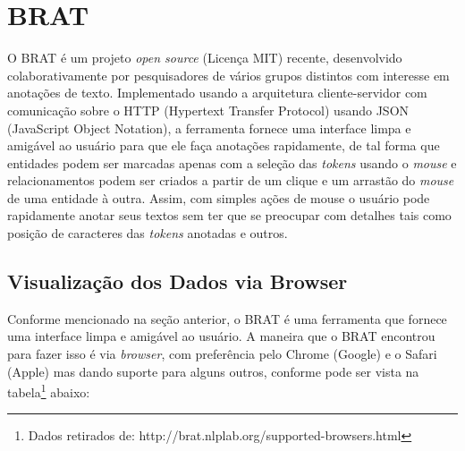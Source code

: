 \documentclass[11pt]{report}
\begin{document}
\section{BRAT}

\indent\indent O BRAT é um projeto \textit{open source} (Licença MIT) recente, desenvolvido colaborativamente por pesquisadores de vários grupos distintos com interesse em
anotações de texto. Implementado usando a arquitetura cliente-servidor com comunicação sobre o HTTP (Hypertext Transfer Protocol) usando JSON (JavaScript Object Notation), a
ferramenta fornece uma interface limpa e amigável ao usuário para que ele faça anotações rapidamente, de tal forma que
entidades podem ser marcadas apenas com a seleção das \textit{tokens} usando o \textit{mouse} e relacionamentos podem ser criados a partir de um clique e um arrastão do
\textit{mouse} de uma entidade à outra. Assim, com simples ações de mouse o usuário pode rapidamente anotar seus textos sem ter que se preocupar com detalhes tais como
posição de caracteres das \textit{tokens} anotadas e outros.

\subsection{Visualização dos Dados via Browser}

\indent\indent Conforme mencionado na seção anterior, o BRAT é uma ferramenta que fornece uma interface limpa e amigável ao usuário. A maneira que o BRAT encontrou para fazer isso
é via \textit{browser}, com preferência pelo Chrome (Google) e o Safari (Apple) mas dando suporte para alguns outros, conforme pode ser vista na
tabela\footnote[4]{Dados retirados de: http://brat.nlplab.org/supported-browsers.html} abaixo:
\end{document}
